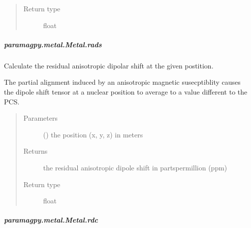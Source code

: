 \documentclass[a4paper,10pt,english,openany,oneside]{sphinxmanual}
\begin{document}
\begin{fulllineitems}
\begin{fulllineitems}
\begin{fulllineitems}
\begin{quote}
\begin{description}
\item[{Return type}] \leavevmode
\sphinxAtStartPar
float

\end{description}\end{quote}

\end{fulllineitems}



\subparagraph{paramagpy.metal.Metal.rads}
\label{\detokenize{reference/generated/paramagpy.metal.Metal.rads:paramagpy-metal-metal-rads}}\label{\detokenize{reference/generated/paramagpy.metal.Metal.rads::doc}}

\begin{fulllineitems}
\label{\detokenize{reference/generated/paramagpy.metal.Metal.rads:paramagpy.metal.Metal.rads}}
\sphinxAtStartPar
Calculate the residual anisotropic dipolar shift at the
given postition.

\sphinxAtStartPar
The partial alignment induced by an anisotropic
magnetic susecptiblity causes the dipole shift tensor at a nuclear
position to average to a value different to the PCS.
\begin{quote}\begin{description}
\item[{Parameters}] \leavevmode
\sphinxAtStartPar
{} () \textendash{} the position (x, y, z) in meters

\item[{Returns}] \leavevmode
\sphinxAtStartPar
{} \textendash{} the residual anisotropic dipole shift in parts\sphinxhyphen{}per\sphinxhyphen{}million (ppm)

\item[{Return type}] \leavevmode
\sphinxAtStartPar
float

\end{description}\end{quote}

\end{fulllineitems}



\subparagraph{paramagpy.metal.Metal.rdc}
\label{\detokenize{reference/generated/paramagpy.metal.Metal.rdc:paramagpy-metal-metal-rdc}}\label{\detokenize{reference/generated/paramagpy.metal.Metal.rdc::doc}}


\end{fulllineitems}
\end{fulllineitems}
\end{document}
